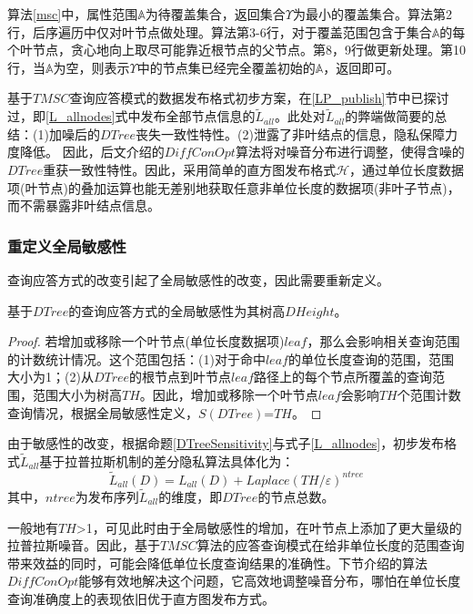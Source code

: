 算法\ref{msc}中，属性范围$\mathbb{A}$为待覆盖集合，返回集合$\Upsilon$为最小的覆盖集合。算法第2行，后序遍历中仅对叶节点做处理。算法第3-6行，对于覆盖范围包含于集合$\mathbb{A}$的每个叶节点，贪心地向上取尽可能靠近根节点的父节点。第8，9行做更新处理。第10行，当$\mathbb{A}$为空，则表示$\Upsilon$中的节点集已经完全覆盖初始的$\mathbb{A}$，返回即可。

基于$TMSC$查询应答模式的数据发布格式初步方案，在\ref{LP_publish}节中已探讨过，即\ref{L_allnodes}式中发布全部节点信息的$\tilde{L}_{all}$。此处对$\tilde{L}_{all}$的弊端做简要的总结：(1)加噪后的$DTree$丧失一致性特性。(2)泄露了非叶结点的信息，隐私保障力度降低。
因此，后文介绍的$DiffConOpt$算法将对噪音分布进行调整，使得含噪的$DTree$重获一致性特性。因此，采用简单的直方图发布格式$\mathcal{H}$，通过单位长度数据项(叶节点)的叠加运算也能无差别地获取任意非单位长度的数据项(非叶子节点)，而不需暴露非叶结点信息。

\subsubsection{重定义全局敏感性}

查询应答方式的改变引起了全局敏感性的改变，因此需要重新定义。

\begin{prop}
	\label{DTreeSensitivity}
	基于$DTree$的查询应答方式的全局敏感性为其树高$DHeight$。
\end{prop}
\begin{proof}
	若增加或移除一个叶节点(单位长度数据项)$leaf$，那么会影响相关查询范围的计数统计情况。这个范围包括：(1)对于命中$leaf$的单位长度查询的范围，范围大小为1；(2)从$DTree$的根节点到叶节点$leaf$路径上的每个节点所覆盖的查询范围，范围大小为树高$TH$。因此，增加或移除一个叶节点$leaf$会影响$TH$个范围计数查询情况，根据全局敏感性定义，$S(DTree)$=$TH$。
\end{proof}

由于敏感性的改变，根据命题\ref{DTreeSensitivity}与式子\ref{L_allnodes}，初步发布格式$\tilde{L}_{all}$基于拉普拉斯机制的差分隐私算法具体化为：
\begin{equation}
\label{chap4_dtree}
\tilde{L}_{all}(D) = L_{all}(D) + \textit{Laplace}(TH/\varepsilon)^{ntree}
\end{equation}
其中，$ntree$为发布序列$\tilde{L}_{all}$的维度，即$DTree$的节点总数。

一般地有$TH$>1，可见此时由于全局敏感性的增加，在叶节点上添加了更大量级的拉普拉斯噪音。因此，基于$TMSC$算法的应答查询模式在给非单位长度的范围查询带来效益的同时，可能会降低单位长度查询结果的准确性。下节介绍的算法$DiffConOpt$能够有效地解决这个问题，它高效地调整噪音分布，哪怕在单位长度查询准确度上的表现依旧优于直方图发布方式。

